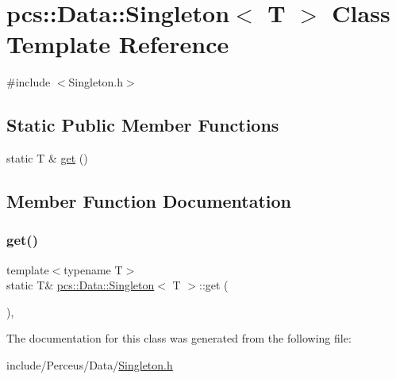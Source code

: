 \hypertarget{classpcs_1_1Data_1_1Singleton}{}\section{pcs\+:\+:Data\+:\+:Singleton$<$ T $>$ Class Template Reference}
\label{classpcs_1_1Data_1_1Singleton}


{\ttfamily \#include $<$Singleton.\+h$>$}

\subsection*{Static Public Member Functions}
\begin{DoxyCompactItemize}
\item 
static T \& \hyperlink{classpcs_1_1Data_1_1Singleton_aa38eaea8bd7d76e4e6eaa39b81e4d609}{get} ()
\end{DoxyCompactItemize}


\subsection{Member Function Documentation}
\mbox{\label{classpcs_1_1Data_1_1Singleton_aa38eaea8bd7d76e4e6eaa39b81e4d609}} 
\subsubsection{\texorpdfstring{get()}{get()}}
{\footnotesize\ttfamily template$<$typename T$>$ \\
static T\& \hyperlink{classpcs_1_1Data_1_1Singleton}{pcs\+::\+Data\+::\+Singleton}$<$ T $>$\+::get (\begin{DoxyParamCaption}{ }\end{DoxyParamCaption})\hspace{0.3cm}{\ttfamily [inline]}, {\ttfamily [static]}}



The documentation for this class was generated from the following file\+:\begin{DoxyCompactItemize}
\item 
include/\+Perceus/\+Data/\hyperlink{Singleton_8h}{Singleton.\+h}\end{DoxyCompactItemize}
